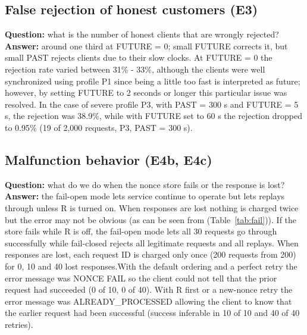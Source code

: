 \documentclass[conference]{IEEEtran}
\begin{document}
\subsection{False rejection of honest customers (E3)}
\textbf{Question:} what is the number of honest clients that are wrongly rejected? \textbf{Answer:} around one third at FUTURE = 0; small FUTURE corrects it, but small PAST rejects clients due to their slow clocks. At FUTURE = 0 the rejection rate varied between 31\% - 33\%, although the clients were well synchronized using profile P1 since being a little too fast is interpreted as future; however, by setting FUTURE to 2 seconds or longer this particular issue was resolved. In the case of severe profile P3, with PAST = 300 s and FUTURE = 5 s, the rejection was 38.9\%, while with FUTURE set to 60 s the rejection dropped to 0.95\% (19 of 2,000 requests, P3, PAST = 300 s).

\subsection{Malfunction behavior (E4b, E4c) }
\textbf{Question:} what do we do when the nonce store fails or the response is lost? \textbf{Answer:} the fail-open mode lets service continue to operate but lets replays through unless R is turned on. When responses are lost nothing is charged twice but the error may not be obvious (as can be seen from (Table~\ref{tab:fail})). If the store fails while R is off, the fail-open mode lets all 30 requests go through successfully while fail-closed rejects all legitimate requests and all replays. When responses are lost, each request ID is charged only once (200 requests from 200) for 0, 10 and 40 lost responses.With the default ordering and a perfect retry the error message was NONCE FAIL so the client could not tell that the prior request had succeeded (0 of 10, 0 of 40). With R first or a new-nonce retry the error message was ALREADY\_PROCESSED allowing the client to know that the earlier request had been successful (success inferable in 10 of 10 and 40 of 40 retries).
\end{document}
